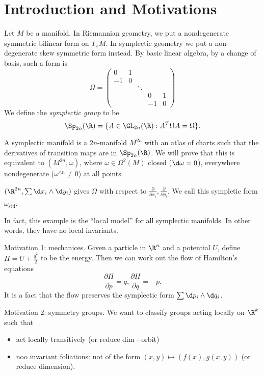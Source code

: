 \documentclass[a4paper]{article}
\newcommand{\w}{\wedge} %
\begin{document}


\tableofcontents

\setcounter{section}{-1}

\section{Introduction and Motivations}

Let \(M\) be a manifold. In Riemannian geometry, we put a nondegenerate symmetric bilinear form on \(T_xM\). In symplectic geometry we put a non-degenerate skew symmetric form instead. By basic linear algebra, by a change of basis, such a form is
\[
  \Omega =
  \begin{pmatrix}
    0 & 1 \\
    -1 & 0 \\
    & & \ddots \\
    & & & 0 & 1 \\
    & & & -1 & 0
  \end{pmatrix}
\]
We define the \emph{symplectic group} to be
\[
  \Sp_{2n}(\R) = \{A \in \GL_{2n}(\R): A^T\Omega A = \Omega\}.
\]

A symplectic manifold is a \(2n\)-manifold \(M^{2n}\) with an atlas of charts such that the derivatives of transition maps are in \(\Sp_{2n}(\R)\). We will prove that this is equivalent to \((M^{2n}, \omega)\), where \(\omega \in \Omega^2(M)\) closed (\(\d \omega = 0\)), everywhere nondegenerate (\(\omega^{\w n} \ne 0\)) at all points.

\begin{ex}
  \((\R^{2n}, \sum \d x_i \w \d y_i)\) gives \(\Omega\) with respect to \(\frac{\partial  }{\partial x_i}, \frac{\partial  }{\partial y_i}\). We call this sympletic form \(\omega_{\text{std}}\).
\end{ex}

In fact, this example is the ``local model'' for all symplectic manifolds. In other words, they have no local invariants.

Motivation 1: mechanices. Given a particle in \(\R^n\) and a potential \(U\), define \(H = U + \frac{\dot q^2}{2}\) to be the energy. Then we can work out the flow of Hamilton's equations
\[
  \frac{\partial H}{\partial p} = \dot q, \frac{\partial H}{\partial q} = - \dot p.
\]
It is a fact that the flow preserves the symplectic form \(\sum \d p_i \w \d q_i\).

Motivation 2: symmetry groups. We want to classify groups acting locally on \(\R^k\) such that
\begin{itemize}
\item act locally transitively (or reduce dim - orbit)
\item noo invariant foliations: not of the form \((x, y) \mapsto (f(x), g(x, y))\) (or reduce dimension).
\end{itemize}
\end{document}
